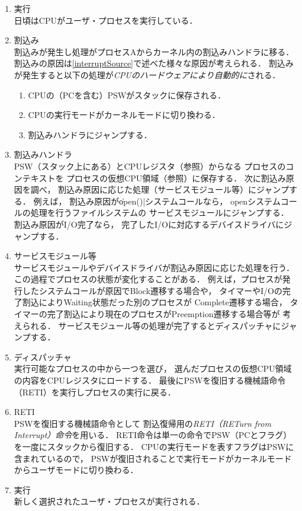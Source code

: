 \begin{enumerate}
\item 実行 \\
  日頃はCPUがユーザ・プロセスを実行している．
\item 割込み \\
  割込みが発生し処理がプロセスAからカーネル内の割込みハンドラに移る．
  割込みの原因は\ref{interruptSource}で述べた様々な原因が考えられる．
  割込みが発生すると以下の処理が\emph{CPUのハードウェアにより自動的に}される．
  \begin{enumerate}
  \item CPUの（PCを含む）PSWがスタックに保存される．
  \item CPUの実行モードがカーネルモードに切り換わる．
  \item 割込みハンドラにジャンプする．
  \end{enumerate}
\item 割込みハンドラ \\
  PSW（スタック上にある）とCPUレジスタ（参照）からなる
  プロセスのコンテキストを
  プロセスの仮想CPU領域（参照）に保存する．
  次に割込み原因を調べ，
  割込み原因に応じた処理（サービスモジュール等）にジャンプする．
  例えば，
  割込み原因が\|open()|システムコールなら，
  openシステムコールの処理を行うファイルシステムの
  サービスモジュールにジャンプする．
  割込み原因がI/O完了なら，
  完了したI/Oに対応するデバイスドライバにジャンプする．
\item サービスモジュール等 \\
  サービスモジュールやデバイスドライバが割込み原因に応じた処理を行う．
  この過程でプロセスの状態が変化することがある．
  例えば，プロセスが発行したシステムコールが原因でBlock遷移する場合や，
  タイマーやI/Oの完了割込によりWaiting状態だった別のプロセスが
  Complete遷移する場合，
  タイマーの完了割込により現在のプロセスがPreemption遷移する場合等が
  考えられる．
  サービスモジュール等の処理が完了するとディスパッチャにジャンプする．
\item ディスパッチャ \\
  実行可能なプロセスの中から一つを選び，
  選んだプロセスの仮想CPU領域の内容をCPUレジスタにロードする．
  最後にPSWを復旧する機械語命令（RETI）を実行しプロセスの実行に戻る．
\item RETI \\
  PSWを復旧する機械語命令として
  割込復帰用の\emph{RETI（RETurn from Interrupt）命令}を用いる．
  RETI命令は単一の命令でPSW（PCとフラグ）を一度にスタックから復旧する．
  CPUの実行モードを表すフラグはPSWに含まれているので，
  PSWが復旧されることで実行モードがカーネルモードからユーザモードに切り換わる．
\item 実行 \\
  新しく選択されたユーザ・プロセスが実行される．
\end{enumerate}

